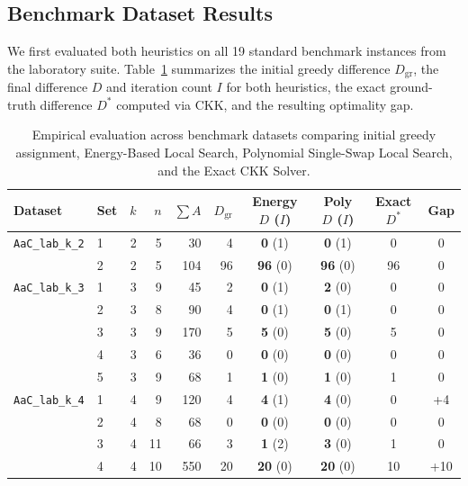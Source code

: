 \documentclass[11pt,a4paper]{article}
\begin{document}
\subsection{Benchmark Dataset Results}
We first evaluated both heuristics on all 19 standard benchmark instances from the laboratory suite. Table~\ref{tab:empirical_results} summarizes the initial greedy difference $D_{\mathrm{gr}}$, the final difference $D$ and iteration count $I$ for both heuristics, the exact ground-truth difference $D^*$ computed via CKK, and the resulting optimality gap.

\begin{table}[H]
\centering
\footnotesize
\setlength{\tabcolsep}{3.5pt}
\caption{Empirical evaluation across benchmark datasets comparing initial greedy assignment, Energy-Based Local Search, Polynomial Single-Swap Local Search, and the Exact CKK Solver.}
\label{tab:empirical_results}
\begin{tabular}{llrrrrcccc}
\toprule
Dataset & Set & $k$ & $n$ & $\sum A$ & $D_{\mathrm{gr}}$ & Energy $D$ ($I$) & Poly $D$ ($I$) & Exact $D^*$ & Gap \\
\midrule
\texttt{AaC\_lab\_k\_2} & 1 & 2 & 5 & 30 & 4 & \textbf{0} (1) & \textbf{0} (1) & 0 & 0 \\
                        & 2 & 2 & 5 & 104 & 96 & \textbf{96} (0) & \textbf{96} (0) & 96 & 0 \\
\midrule
\texttt{AaC\_lab\_k\_3} & 1 & 3 & 9 & 45 & 2 & \textbf{0} (1) & \textbf{2} (0) & 0 & 0 \\
                        & 2 & 3 & 8 & 90 & 4 & \textbf{0} (1) & \textbf{0} (1) & 0 & 0 \\
                        & 3 & 3 & 9 & 170 & 5 & \textbf{5} (0) & \textbf{5} (0) & 5 & 0 \\
                        & 4 & 3 & 6 & 36 & 0 & \textbf{0} (0) & \textbf{0} (0) & 0 & 0 \\
                        & 5 & 3 & 9 & 68 & 1 & \textbf{1} (0) & \textbf{1} (0) & 1 & 0 \\
\midrule
\texttt{AaC\_lab\_k\_4} & 1 & 4 & 9 & 120 & 4 & \textbf{4} (1) & \textbf{4} (0) & 0 & +4 \\
                        & 2 & 4 & 8 & 68 & 0 & \textbf{0} (0) & \textbf{0} (0) & 0 & 0 \\
                        & 3 & 4 & 11 & 66 & 3 & \textbf{1} (2) & \textbf{3} (0) & 1 & 0 \\
                        & 4 & 4 & 10 & 550 & 20 & \textbf{20} (0) & \textbf{20} (0) & 10 & +10 \\

\end{tabular}
\end{table}
\end{document}
